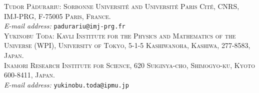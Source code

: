 \documentclass [11pt,oneside,a4paper,mathscr]{amsart}
\theoremstyle{definition}
\begin{document}
%
%


\textsc{\small Tudor P\u adurariu: Sorbonne Université and Université Paris Cité, CNRS, IMJ-PRG, F-75005 Paris, France.}\\
\textit{\small E-mail address:} \texttt{\small padurariu@imj-prg.fr}\\

\textsc{\small Yukinobu Toda: Kavli Institute for the Physics and Mathematics of the Universe (WPI), University of Tokyo, 5-1-5 Kashiwanoha, Kashiwa, 277-8583, Japan.}\\
\textsc{\small 
Inamori Research Institute for Science, 620 Suiginya-cho, Shimogyo-ku, Kyoto 600-8411, Japan.} \\
\textit{\small E-mail address:} \texttt{\small yukinobu.toda@ipmu.jp}\\



 
\end{document}
